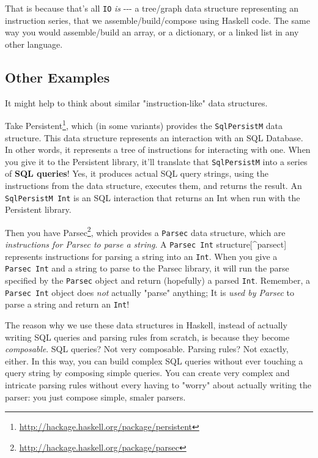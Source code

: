 \documentclass[]{article}
\renewcommand{\href}[2]{#2\footnote{\url{#1}}}
\begin{document}
That is because that's all \texttt{IO} \emph{is} -\/-\/- a tree/graph data
structure representing an instruction series, that we assemble/build/compose
using Haskell code. The same way you would assemble/build an array, or a
dictionary, or a linked list in any other language.

\subsection{Other Examples}

It might help to think about similar "instruction-like" data structures.

Take \href{http://hackage.haskell.org/package/persistent}{Persistent}, which (in
some variants) provides the \texttt{SqlPersistM} data structure. This data
structure represents an interaction with an SQL Database. In other words, it
represents a tree of instructions for interacting with one. When you give it to
the Persistent library, it'll translate that \texttt{SqlPersistM} into a series
of \textbf{SQL queries}! Yes, it produces actual SQL query strings, using the
instructions from the data structure, executes them, and returns the result. An
\texttt{SqlPersistM\ Int} is an SQL interaction that returns an Int when run
with the Persistent library.

Then you have \href{http://hackage.haskell.org/package/parsec}{Parsec}, which
provides a \texttt{Parsec} data structure, which are \emph{instructions for
Parsec to parse a string}. A \texttt{Parsec\ Int} structure{[}\^{}parsect{]}
represents instructions for parsing a string into an \texttt{Int}. When you give
a \texttt{Parsec\ Int} and a string to parse to the Parsec library, it will run
the parse specified by the \texttt{Parsec} object and return (hopefully) a
parsed \texttt{Int}. Remember, a \texttt{Parsec\ Int} object does \emph{not}
actually "parse" anything; It is \emph{used by Parsec} to parse a string and
return an \texttt{Int}!

The reason why we use these data structures in Haskell, instead of actually
writing SQL queries and parsing rules from scratch, is because they become
\emph{composable}. SQL queries? Not very composable. Parsing rules? Not exactly,
either. In this way, you can build complex SQL queries without ever touching a
query string by composing simple queries. You can create very complex and
intricate parsing rules without every having to "worry" about actually writing
the parser: you just compose simple, smaler parsers.
\end{document}
